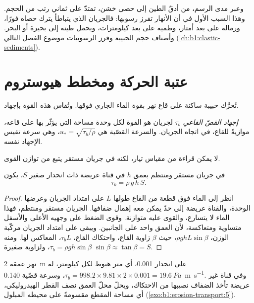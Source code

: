 وعبر مدى الرسم، من أدقّ الطين إلى حصى خشن، تمتدّ  على ثماني رتب من الحجم. وهذا السبب الأول في أن الأنهار تفرز رسوبها: فالجريان الذي يتباطأ يترك حصاه فورًا، ورماله على بعد أمتار، وطميه على بعد كيلومترات، ويحمل طينه إلى بحيرة أو البحر. وأصناف حجم الحبيبة وفرز الرسوبيات موضوع الفصل التالي (\cref{ch:b1:clastic-sediments}).

\section{عتبة الحركة ومخطط هيوستروم}\label{sec:b1:erosion-transport:threshold}

تُحرَّك حبيبة ساكنة على قاع نهر بقوة الماء الجاري فوقها. وتُقاس هذه القوة بإجهاد.

\begin{definition}\label{def:b1:erosion-transport:bed-shear}
\emph{إجهاد القصّ القاعي} $\tau_b$ لجريان هو القوة لكل وحدة مساحة التي يؤثّر بها على قاعه، موازيةً للقاع، في اتجاه الجريان. والسرعة القصّية هي $u_* = \sqrt{\tau_b/\rho}$، وهي سرعة تقيس الإجهاد نفسه.
\end{definition}

لا يمكن قراءة  من مقياس تيار، لكنه في جريان مستقر يتبع من توازن القوى.

\begin{proposition}\label{prop:b1:erosion-transport:depth-slope}
في جريان مستقر ومنتظم بعمق $h$ في قناة عريضة ذات انحدار صغير $S$، يكون 
\[
  \tau_b = \rho\,g\,h\,S .
\]
\end{proposition}

\begin{proof}
انظر إلى الماء فوق قطعة من القاع طولها $L$ على امتداد الجريان وعرضها الوحدة، والقناة عريضة إلى حدّ يمكن معه إهمال ضفافها. الجريان مستقر ومنتظم، فهذا الماء لا يتسارع، والقوى عليه متوازنة. وقوى الضغط على وجهيه الأعلى والأسفل متساوية ومتعاكسة، لأن العمق واحد على الجانبين. ويبقى على امتداد الجريان مركّبة الوزن، $\rho g h L \sin\beta$، حيث $\beta$ زاوية القاع، واحتكاك القاع، $\tau_b L$، المعاكس لها. ومنه $\tau_b
= \rho g h \sin\beta$، ولزاوية صغيرة $\sin\beta \approx \tan\beta = S$.
\end{proof}

نهر عمقه \qty{2}{m} على انحدار \num{0.001}، أي متر هبوط لكل كيلومتر، له $\tau_b = 998.2 \times 9.81 \times 2 \times 0.001 =
\qty{19.6}{Pa}$، وسرعة قصّية \qty{0.140}{m.s^{-1}}. وفي قناة غير عريضة تأخذ الضفاف نصيبها من الاحتكاك، ويحلّ محلّ العمق نصف القطر الهيدروليكي، أي مساحة المقطع مقسومةً على محيطه المبلول (\cref{exo:b1:erosion-transport:5}).

